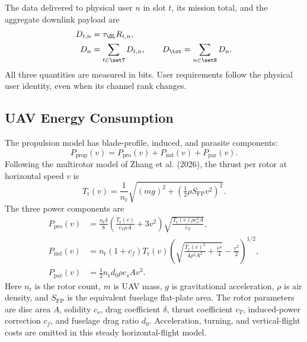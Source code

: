 The data delivered to physical user $n$ in slot $t$, its mission total, and the aggregate downlink payload are
\begin{align}
D_{t,n}&=\tau_{\DL}R_{t,n},\label{eq:slot_bits}\\
D_n&=\sum_{t\in\setT}D_{t,n},\qquad
D_{\tot}=\sum_{n\in\setN}D_n.
\label{eq:total_bits}
\end{align}
All three quantities are measured in bits. User requirements follow the physical user identity, even when its channel rank changes.

\subsection{UAV Energy Consumption}
The propulsion model has blade-profile, induced, and parasite components:
\begin{equation}
P_{\mathrm{prop}}(v)=P_{\mathrm{pro}}(v)
+P_{\mathrm{ind}}(v)+P_{\mathrm{par}}(v).
\label{eq:propulsion}
\end{equation}
Following the multirotor model of Zhang et al. (2026), the thrust per rotor at horizontal speed $v$ is
\begin{equation}
T_{\mathrm r}(v)=\frac{1}{n_{\mathrm r}}
\sqrt{(mg)^2+\left(\tfrac12\rho S_{\mathrm{FP}}v^2\right)^2}.
\label{eq:thrust}
\end{equation}
The three power components are
\begin{align}
P_{\mathrm{pro}}(v)&=\frac{n_{\mathrm r}\delta}{8}
\left(\frac{T_{\mathrm r}(v)}{c_T\rho A}+3v^2\right)
\sqrt{\frac{T_{\mathrm r}(v)\rho c_s^2 A}{c_T}},\label{eq:profile}\\
P_{\mathrm{ind}}(v)&=n_{\mathrm r}(1+c_f)T_{\mathrm r}(v)
\left(\sqrt{\frac{T_{\mathrm r}(v)^2}{4\rho^2A^2}
+\frac{v^4}{4}}-\frac{v^2}{2}\right)^{1/2},\label{eq:induced}\\
P_{\mathrm{par}}(v)&=\tfrac12n_{\mathrm r}d_0\rho c_sAv^3.
\label{eq:parasite}
\end{align}
Here $n_{\mathrm r}$ is the rotor count, $m$ is UAV mass, $g$ is gravitational acceleration, $\rho$ is air density, and $S_{\mathrm{FP}}$ is the equivalent fuselage flat-plate area. The rotor parameters are disc area $A$, solidity $c_s$, drag coefficient $\delta$, thrust coefficient $c_T$, induced-power correction $c_f$, and fuselage drag ratio $d_0$. Acceleration, turning, and vertical-flight costs are omitted in this steady horizontal-flight model.

